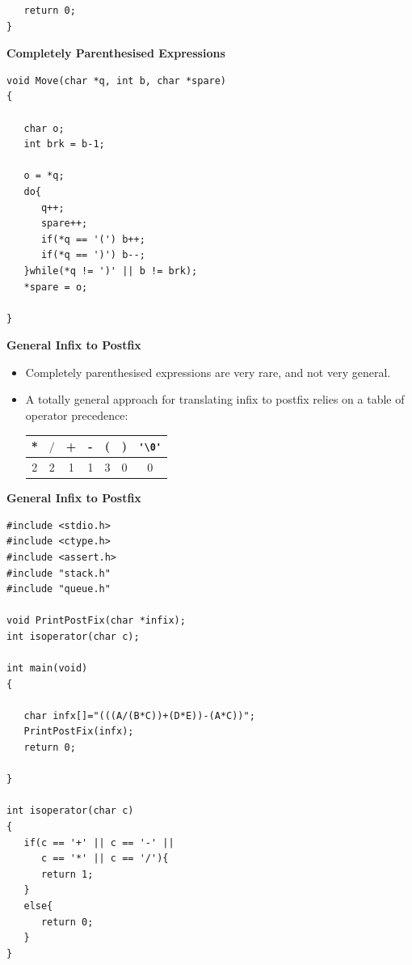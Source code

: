 \documentclass[a4,portraitt]{slides}
\begin{document}
{{{\begin{verbatim}
   return 0;
}
\end{verbatim}
}

\newpage
{\samepage
\begin{center}
{\Large{\bf Completely Parenthesised Expressions}}
\end{center}
\begin{verbatim}
void Move(char *q, int b, char *spare)
{

   char o;
   int brk = b-1;

   o = *q;
   do{
      q++;
      spare++;
      if(*q == '(') b++;
      if(*q == ')') b--;
   }while(*q != ')' || b != brk);
   *spare = o;

}
\end{verbatim}
}

\newpage
{\samepage
\begin{center}
{\Large{\bf General Infix to Postfix}}
\end{center}
\begin{itemize}
\item Completely parenthesised expressions are very rare, and not very general.
\item A totally general approach for translating infix to postfix relies on
a table of operator precedence:
{\large
\begin{center}
\begin{tabular}{|c|c|c|c|c|c|c|}\hline
*&$/$&+&-&(&)&\verb^'\0'^ \\ \hline
2&2&1&1&3&0&0\\\hline
\end{tabular}
\end{center}
}
\end{itemize}
}

\newpage
{\samepage
\begin{center}
{\Large{\bf General Infix to Postfix}}
\end{center}
{\small
\begin{verbatim}
#include <stdio.h>
#include <ctype.h>
#include <assert.h>
#include "stack.h"
#include "queue.h"

void PrintPostFix(char *infix);
int isoperator(char c);

int main(void)
{

   char infx[]="(((A/(B*C))+(D*E))-(A*C))";
   PrintPostFix(infx);
   return 0;

}

int isoperator(char c)
{
   if(c == '+' || c == '-' ||
      c == '*' || c == '/'){
      return 1;
   }
   else{
      return 0;
   }
}
\end{verbatim}
}}

}}
\end{document}
